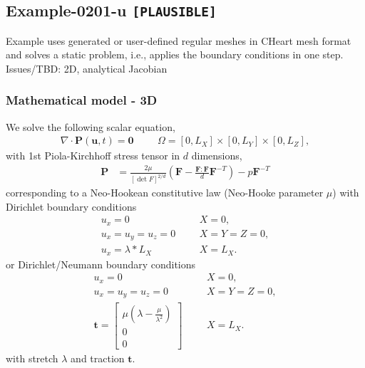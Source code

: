 %
\clearpage
%
\subsection{Example-0201-u \texttt{[PLAUSIBLE]}}
%
Example uses generated or user-defined regular meshes in CHeart mesh format
and solves a static problem, i.e., applies the boundary conditions in one step.\\[3ex]

Issues/TBD: 2D, analytical Jacobian
%
%
\subsubsection{Mathematical model - 3D}
%
We solve the following scalar equation,
%
\begin{align}
    \nabla \cdot \boldsymbol{P} (\boldsymbol{u}, t) = \boldsymbol{0} & &&\Omega = [0, L_X] \times [0, L_Y] \times [0, L_Z],
\end{align}
%
with 1st Piola-Kirchhoff stress tensor in $d$ dimensions,
%
\begin{align}
    \boldsymbol{P} &= \frac{2 \mu}{[\det F]^{2/d}} \left( \boldsymbol{F} - \frac{\boldsymbol{F} : \boldsymbol{F}}{d} \boldsymbol{F}^{-T} \right) - p \boldsymbol{F}^{-T}
\end{align}
%
corresponding to a Neo-Hookean constitutive law (Neo-Hooke parameter $\mu$)
with Dirichlet boundary conditions
%
\begin{align}
    u_x = 0 & &&X = 0, \\
    u_x = u_y = u_z = 0 & && X = Y = Z = 0, \\
		u_x = \lambda * L_X & &&X = L_X.
\end{align}
%
or Dirichlet/Neumann boundary conditions
%
\begin{align}
    u_x = 0 & &&X = 0, \\
    u_x = u_y = u_z = 0 & && X = Y = Z = 0, \\
		\boldsymbol{t} = \begin{bmatrix}
		  \mu (\lambda - \frac{\mu}{\lambda^2}) \\
		  0 \\
		  0
		\end{bmatrix} & &&X = L_X.
\end{align}
%
with stretch $\lambda$ and traction $\boldsymbol{t}$.
%
%
